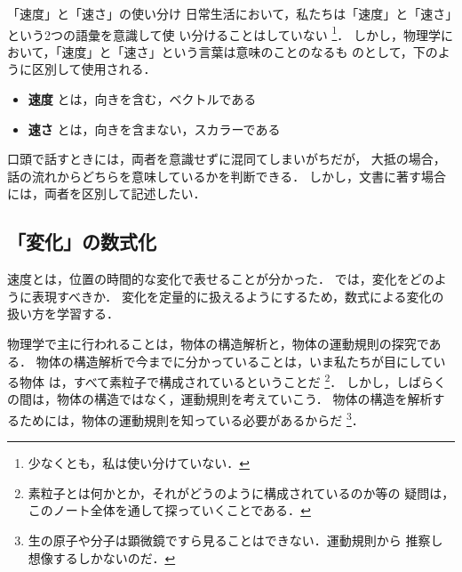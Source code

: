         \begin{memo}{「速度」と「速さ」の使い分け}
            日常生活において，私たちは「速度」と「速さ」という2つの語彙を意識して使
            い分けることはしていない
                \footnote{
                    少なくとも，私は使い分けていない．
                }．
            しかし，物理学において，「速度」と「速さ」という言葉は意味のことのなるも
            のとして，下のように区別して使用される．
                \begin{itemize}
                    \item \textbf{速度} とは，向きを含む，ベクトルである
                    \item \textbf{速さ} とは，向きを含まない，スカラーである
                \end{itemize}

            口頭で話すときには，両者を意識せずに混同てしまいがちだが，
            大抵の場合，話の流れからどちらを意味しているかを判断できる．
            しかし，文書に著す場合には，両者を区別して記述したい．
        \end{memo}

        \subsection{「変化」の数式化}
        \begin{mycomment}
            速度とは，位置の時間的な変化で表せることが分かった．
            では，変化をどのように表現すべきか．
            変化を定量的に扱えるようにするため，数式による変化の扱い方を学習する．
        \end{mycomment}
        物理学で主に行われることは，物体の構造解析と，物体の運動規則の探究である．
        物体の構造解析で今までに分かっていることは，いま私たちが目にしている物体
        は，すべて素粒子で構成されているということだ
            \footnote{
                素粒子とは何かとか，それがどうのように構成されているのか等の
                疑問は，このノート全体を通して探っていくことである．
            }．
        しかし，しばらくの間は，物体の構造ではなく，運動規則を考えていこう．
        物体の構造を解析するためには，物体の運動規則を知っている必要があるからだ
            \footnote{
                生の原子や分子は顕微鏡ですら見ることはできない．運動規則から
                推察し想像するしかないのだ．
            }．

